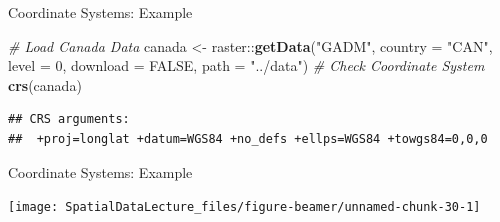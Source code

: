 \documentclass[10pt,ignorenonframetext,]{beamer}
\newenvironment{Shaded}{\begin{snugshade}}{\end{snugshade}}
\newcommand{\KeywordTok}[1]{\textcolor[rgb]{0.13,0.29,0.53}{\textbf{{#1}}}}
\newcommand{\DataTypeTok}[1]{\textcolor[rgb]{0.13,0.29,0.53}{{#1}}}
\newcommand{\DecValTok}[1]{\textcolor[rgb]{0.00,0.00,0.81}{{#1}}}
\newcommand{\StringTok}[1]{\textcolor[rgb]{0.31,0.60,0.02}{{#1}}}
\newcommand{\CommentTok}[1]{\textcolor[rgb]{0.56,0.35,0.01}{\textit{{#1}}}}
\newcommand{\OtherTok}[1]{\textcolor[rgb]{0.56,0.35,0.01}{{#1}}}
\newcommand{\NormalTok}[1]{{#1}}
\providecommand{\tightlist}{%
  \setlength{\itemsep}{0pt}\setlength{\parskip}{0pt}}
\begin{document}
\begin{frame}[fragile]{Coordinate Systems: Example}


\begin{Shaded}
\begin{Highlighting}[]
\CommentTok{# Load Canada Data}
\NormalTok{canada <-}\StringTok{ }\NormalTok{raster::}\KeywordTok{getData}\NormalTok{(}\StringTok{"GADM"}\NormalTok{, }\DataTypeTok{country =} \StringTok{"CAN"}\NormalTok{, }
    \DataTypeTok{level =} \DecValTok{0}\NormalTok{, }\DataTypeTok{download =} \OtherTok{FALSE}\NormalTok{, }\DataTypeTok{path =} \StringTok{"../data"}\NormalTok{)}
\CommentTok{# Check Coordinate System}
\KeywordTok{crs}\NormalTok{(canada)}
\end{Highlighting}
\end{Shaded}

\begin{verbatim}
## CRS arguments:
##  +proj=longlat +datum=WGS84 +no_defs +ellps=WGS84 +towgs84=0,0,0
\end{verbatim}

\end{frame}

\begin{frame}{Coordinate Systems: Example}

\begin{center}\texttt{[image: SpatialDataLecture\_files/figure-beamer/unnamed-chunk-30-1]} \end{center}

\end{frame}
\end{document}
